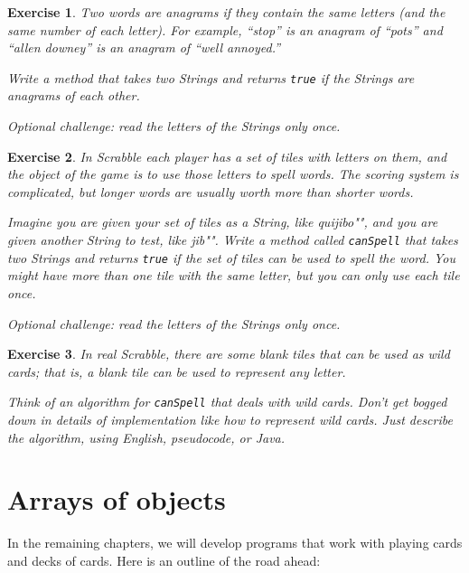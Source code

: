 \documentclass[12pt]{book}
\theoremstyle{exercise}
\newtheorem{exercise}{Exercise}[chapter]
\newcommand{\java}[1]{\verb"#1"}
\newcommand{\java}[1]{\lstinline{#1}} %
\begin{document}
\begin{exercise}
Two words are anagrams if they contain the same letters (and the same number of each letter).
For example, ``stop'' is an anagram of ``pots'' and ``allen downey'' is an anagram of ``well annoyed.''

Write a method that takes two Strings and returns \java{true} if the Strings are anagrams of each other.

Optional challenge: read the letters of the Strings only once.
\end{exercise}


\begin{exercise}
In Scrabble each player has a set of tiles with letters on them, and the object of the game is to use those letters to spell words.
The scoring system is complicated, but longer words are usually worth more than shorter words.

Imagine you are given your set of tiles as a String, like \java{"quijibo"}, and you are given another String to test, like \java{"jib"}.
Write a method called \java{canSpell} that takes two Strings and returns \java{true} if the set of tiles can be used to spell the word.
You might have more than one tile with the same letter, but you can only use each tile once.

Optional challenge: read the letters of the Strings only once.
\end{exercise}


\begin{exercise}
In real Scrabble, there are some blank tiles that can be used as wild cards; that is, a blank tile can be used to represent any letter.

Think of an algorithm for \java{canSpell} that deals with wild cards.
Don't get bogged down in details of implementation like how to represent wild cards.
Just describe the algorithm, using English, pseudocode, or Java.
\end{exercise}


\chapter{Arrays of objects}


In the remaining chapters, we will develop programs that work with playing cards and decks of cards.
Here is an outline of the road ahead:
\end{document}
